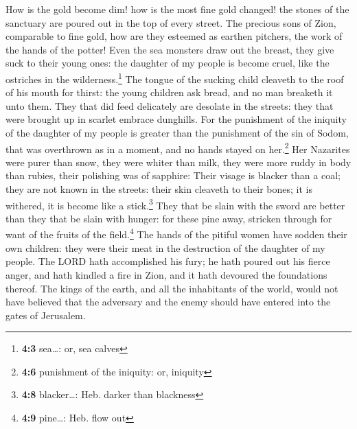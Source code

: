  How is the gold become dim! how is the most fine gold
changed! the stones of the sanctuary are poured out in the top of every
street.  The precious sons of Zion, comparable to fine
gold, how are they esteemed as earthen pitchers, the work of the hands
of the potter!  Even the sea monsters draw out the breast,
they give suck to their young ones: the daughter of my people is become
cruel, like the ostriches in the wilderness.\footnote{\textbf{4:3}
  sea\ldots: or, sea calves}  The tongue of the sucking
child cleaveth to the roof of his mouth for thirst: the young children
ask bread, and no man breaketh it unto them.  They that
did feed delicately are desolate in the streets: they that were brought
up in scarlet embrace dunghills.  For the punishment of
the iniquity of the daughter of my people is greater than the punishment
of the sin of Sodom, that was overthrown as in a moment, and no hands
stayed on her.\footnote{\textbf{4:6} punishment of the iniquity: or,
  iniquity}  Her Nazarites were purer than snow, they were
whiter than milk, they were more ruddy in body than rubies, their
polishing was of sapphire:  Their visage is blacker than a
coal; they are not known in the streets: their skin cleaveth to their
bones; it is withered, it is become like a stick.\footnote{\textbf{4:8}
  blacker\ldots: Heb. darker than blackness}  They that be
slain with the sword are better than they that be slain with hunger: for
these pine away, stricken through for want of the fruits of the
field.\footnote{\textbf{4:9} pine\ldots: Heb. flow out} 
The hands of the pitiful women have sodden their own children: they were
their meat in the destruction of the daughter of my people.
 The LORD hath accomplished his fury; he hath poured out
his fierce anger, and hath kindled a fire in Zion, and it hath devoured
the foundations thereof.  The kings of the earth, and all
the inhabitants of the world, would not have believed that the adversary
and the enemy should have entered into the gates of Jerusalem.

